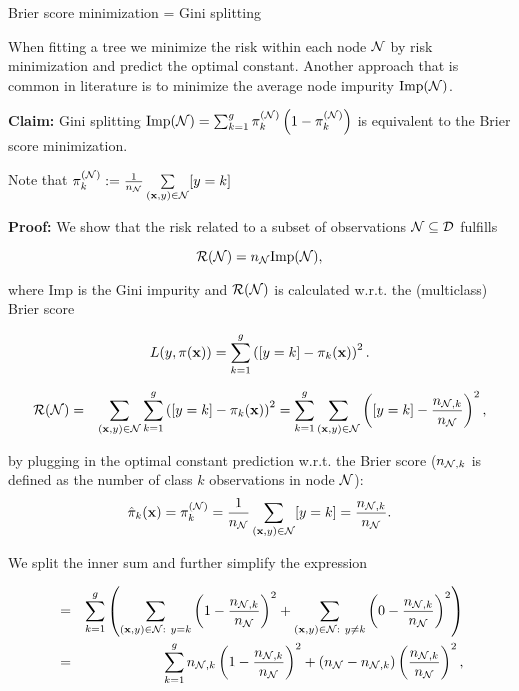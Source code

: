 \documentclass[11pt,compress,t,notes=noshow, xcolor=table]{beamer}
\begin{document}
\begin{vbframe}{Brier score minimization = Gini splitting}

When fitting a tree we minimize the risk within each node $\mathcal{N}$ by risk minimization and predict the optimal constant. Another approach that is common in literature is to minimize the average node impurity $\text{Imp}(\mathcal{N})$. 

\vspace*{0.2cm}

\textbf{Claim:} Gini splitting $\text{Imp}(\mathcal{N}) = \sum_{k=1}^g \pi_k^{(\mathcal{N})} \left(1-\pi_k^{(\mathcal{N})} \right)$ is equivalent to the Brier score minimization. 

\begin{footnotesize}
Note that $\pi_k^{(\mathcal{N})} := \frac{1}{n_{\mathcal{N}}} \sum\limits_{(\mathbf{x},y) \in \mathcal{N}} [y = k]$ 
\end{footnotesize}

\vspace*{0.2cm}

\begin{footnotesize}

\textbf{Proof: } We show that the risk related to a subset of observations $\mathcal{N} \subseteq \mathcal{D}$ fulfills 


$$
  \mathcal{R}(\mathcal{N}) = n_{\mathcal{N}} \text{Imp}(\mathcal{N}),
$$
  
  where $\text{Imp}$ is the Gini impurity and $\mathcal{R}(\mathcal{N})$ is calculated w.r.t. the (multiclass) Brier score


$$
  L(y, \pi(\mathbf{x})) = \sum_{k = 1}^g \left([y = k] - \pi_k(\mathbf{x})\right)^2.
$$

\framebreak

\vspace*{-0.5cm}
\begin{eqnarray*}
\mathcal{R}(\mathcal{N}) &=& \sum_{(\mathbf{x}, y) \in \mathcal{N}}  \sum_{k = 1}^g \left([y = k] - \pi_k(\mathbf{x})\right)^2 
= \sum_{k = 1}^g \sum_{(\mathbf{x}, y) \in \mathcal{N}} \left([y = k] - \frac{n_{\mathcal{N},k}}{n_{\mathcal{N} }}\right)^2,
\end{eqnarray*}

by plugging in the optimal constant prediction w.r.t. the Brier score ($n_{\mathcal{N},k}$ is defined as the number of class $k$ observations in node $\mathcal{N}$): 
$$\hat \pi_k(\mathbf{x})= \pi_k^{(\mathcal{N})} = \frac{1}{n_{\mathcal{N}}} \sum\limits_{(\mathbf{x},y) \in \mathcal{N}} [y = k] = \frac{n_{\mathcal{N},k}}{n_{\mathcal{N} }}. $$ 

 We split the inner sum and further simplify the expression

\begin{eqnarray*}
&=& \sum_{k = 1}^{g} \left(\sum_{(\mathbf{x}, y) \in \mathcal{N}: ~ y = k} \left(1 - \frac{n_{\mathcal{N},k}}{n_{\mathcal{N} }}\right)^2 + \sum_{(\mathbf{x}, y) \in \mathcal{N}: ~ y \ne k} \left(0 - \frac{n_{\mathcal{N},k}}{n_{\mathcal{N} }}\right)^2\right) \\
&=& \sum_{k = 1}^g n_{\mathcal{N},k}\left(1 - \frac{n_{\mathcal{N},k}}{n_{\mathcal{N} }}\right)^2 + (n_{\mathcal{N} } - n_{\mathcal{N},k})\left(\frac{n_{\mathcal{N},k}}{n_{\mathcal{N} }}\right)^2, 
\end{eqnarray*}


\end{footnotesize}
\end{vbframe}
\end{document}
